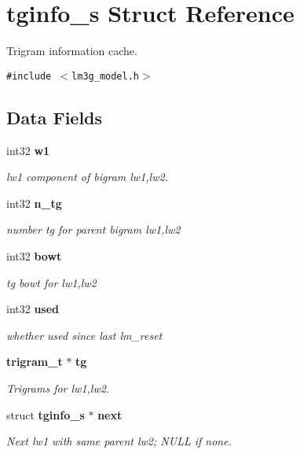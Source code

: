\section{tginfo\_\-s Struct Reference}
\label{structtginfo__s}
Trigram information cache.  


{\tt \#include $<$lm3g\_\-model.h$>$}

\subsection*{Data Fields}
\begin{CompactItemize}
\item 
int32 {\bf w1}
\begin{CompactList}\small\item\em lw1 component of bigram lw1,lw2. \item\end{CompactList}\item 
int32 {\bf n\_\-tg}\label{structtginfo__s_5eb046b3d09a4c80e4cdf216c6c7eb46}

\begin{CompactList}\small\item\em number tg for parent bigram lw1,lw2 \item\end{CompactList}\item 
int32 {\bf bowt}\label{structtginfo__s_c5e9be48da8563941be03f3cd09e3c25}

\begin{CompactList}\small\item\em tg bowt for lw1,lw2 \item\end{CompactList}\item 
int32 {\bf used}\label{structtginfo__s_38d6aa51b244a7138c476a6e663ffbb4}

\begin{CompactList}\small\item\em whether used since last lm\_\-reset \item\end{CompactList}\item 
{\bf trigram\_\-t} $\ast$ {\bf tg}\label{structtginfo__s_3642dc5ac56de1829665bb7d42c9372a}

\begin{CompactList}\small\item\em Trigrams for lw1,lw2. \item\end{CompactList}\item 
struct {\bf tginfo\_\-s} $\ast$ {\bf next}
\begin{CompactList}\small\item\em Next lw1 with same parent lw2; NULL if none. \item\end{CompactList}\end{CompactItemize}


